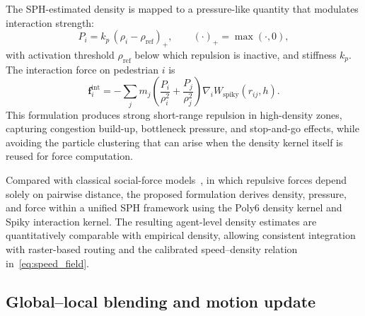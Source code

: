 \documentclass[preprint,12pt]{elsarticle}
\providecommand{\FloatBarrier}{}
\let\origsubsection\subsection
\renewcommand{\subsection}{\FloatBarrier\origsubsection}
\begin{document}
The SPH-estimated density is mapped to a pressure-like quantity that
modulates interaction strength:
\begin{equation}
P_i = k_p\, (\rho_i - \rho_{\mathrm{ref}})_+,
\qquad (\cdot)_+ = \max(\cdot, 0),
\label{eq:pressure_mapping}
\end{equation}
with activation threshold $\rho_{\mathrm{ref}}$ below which repulsion is
inactive, and stiffness $k_p$. The interaction force on pedestrian $i$
is
\begin{equation}
\mathbf{f}_i^{\mathrm{int}}
= -\sum_j m_j\!
\left( \frac{P_i}{\rho_i^2} + \frac{P_j}{\rho_j^2} \right)
\nabla_i W_{\mathrm{spiky}}(r_{ij}, h).
\label{eq:interaction_force_spiky}
\end{equation}
This formulation produces strong short-range repulsion in high-density
zones, capturing congestion build-up, bottleneck pressure, and
stop-and-go effects, while avoiding the particle clustering that can
arise when the density kernel itself is reused for force computation.

Compared with classical social-force
models~\citep{Helbing1995SocialForce}, in which repulsive forces depend
solely on pairwise distance, the proposed formulation derives density,
pressure, and force within a unified SPH framework using the Poly6 density
kernel and Spiky interaction kernel. The resulting agent-level density
estimates are quantitatively comparable with empirical density, allowing consistent integration with
raster-based routing and the calibrated speed--density relation
in~\eqref{eq:speed_field}.

\subsection{Global--local blending and motion update}
\label{sec:motion_update}
\end{document}
